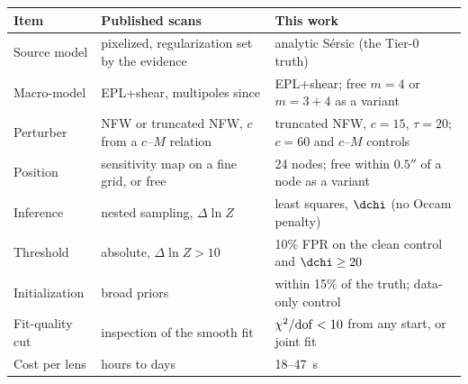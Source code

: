 \begin{tabular}{@{}p{1.55cm}p{2.85cm}p{3.0cm}@{}}
\toprule
Item & Published scans & This work \\
\midrule
Source model & pixelized, regularization set by the evidence & analytic S\'ersic (the Tier-0 truth) \\
Macro-model & EPL+shear, multipoles since \citet{lange2024} & EPL+shear; free $m{=}4$ or $m{=}3{+}4$ as a variant \\
Perturber & NFW or truncated NFW, $c$ from a $c$--$M$ relation & truncated NFW, $c{=}15$, $\tau{=}20$; $c{=}60$ and $c$--$M$ controls \\
Position & sensitivity map on a fine grid, or free & 24 nodes; free within $0.5''$ of a node as a variant \\
Inference & nested sampling, $\Delta\ln Z$ & least squares, $\dchi$ (no Occam penalty) \\
Threshold & absolute, $\Delta\ln Z>10$ & 10\% FPR on the clean control and $\dchi\ge20$ \\
Initialization & broad priors & within 15\% of the truth; data-only control \\
Fit-quality cut & inspection of the smooth fit & $\chi^2/{\rm dof}<10$ from any start, or joint fit \\
Cost per lens & hours to days & 18--47~s \\
\bottomrule
\end{tabular}

